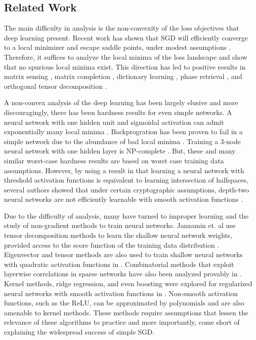 
\subsection {Related Work}



The main difficulty in analysis is the non-convexity of the loss objectives that deep learning present. Recent work has shown that SGD will efficiently converge to a local minimizer and escape saddle points, under modest assumptions \cite{GeHJY15}. Therefore, it suffices to analyze the local minima of the loss landscape and show that no spurious local minima exist. This direction has led to positive results in matrix sensing \cite{ParkKCS16a}, matrix completion \cite{GeLM16}, dictionary learning \cite{SunQW15}, phase retrieval \cite{SunQW16}, and orthogonal tensor decomposition \cite{GeHJY15}. 

A non-convex analysis of the deep learning has been largely elusive and more discouragingly, there has been hardness results for even simple networks. A neural network with one hidden unit and sigmoidal activation can admit exponentially many local minima \cite{Auer}. Backprogration has been proven to fail in a simple network due to the abundance of bad local minima \cite{brady1989back}. Training a 3-node neural network with one hidden layer is { NP}-complete \cite{BlumR88}.  But, these and many similar worst-case hardness results are based on worst case training data assumptions. However, by using a result in \cite{klivans2006cryptographic} that learning a neural network with threshold activation functions is equivalent to learning intersection of halfspaces, several authors showed that under certain cryptographic assumptions, depth-two neural networks are not efficiently learnable with smooth activation functions \cite{LivniSS14} \cite{ZhangLWJ15}\cite{ZhangLJ15}. 

Due to the difficulty of analysis, many have turned to improper learning and the study of non-gradient methods to train neural networks. Janzamin et. al use tensor decomposition methods to learn the shallow neural network weights, provided access to the score function of the training data distribution \cite{JanzaminSA15}. Eigenvector and tensor methods are also used to train shallow neural networks with quadratic activation functions in \cite{LivniSS14}. Combinatorial methods that exploit layerwise correlations in sparse networks have also been analyzed provably in \cite{AroraBGM13}. Kernel methods, ridge regression, and even boosting were explored for regularized neural networks with smooth activation functions in \cite{shalev2011learning}\cite{ZhangLWJ15}\cite{ZhangLJ15}. Non-smooth activation functions, such as the ReLU, can be approximated by polynomials and are also amenable to kernel methods\cite{GoelKKT16}. These methods require assumptions that lessen the relevance of these algorithms to practice and more importantly, come short of explaining the widespread success of simple SGD.

